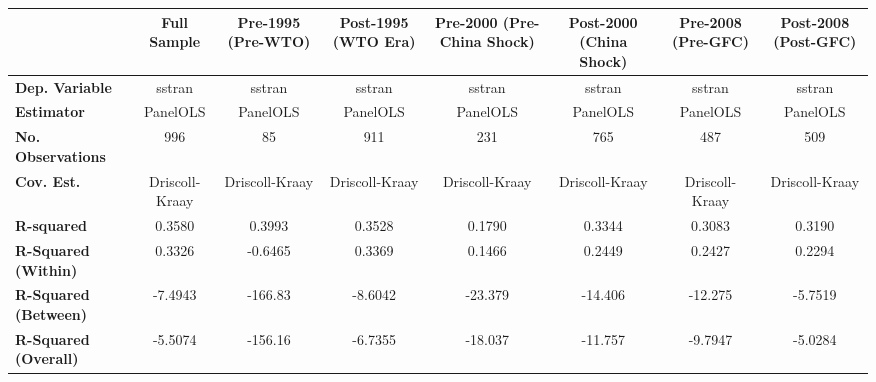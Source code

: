 \begin{center}
\begin{tabular}{lccccccc}
\toprule
                                   & \textbf{Full Sample} & \textbf{Pre-1995 (Pre-WTO)} & \textbf{Post-1995 (WTO Era)} & \textbf{Pre-2000 (Pre-China Shock)} & \textbf{Post-2000 (China Shock)} & \textbf{Pre-2008 (Pre-GFC)} & \textbf{Post-2008 (Post-GFC)}  \\
\midrule
\textbf{Dep. Variable}             &        sstran        &            sstran           &            sstran            &                sstran               &              sstran              &            sstran           &             sstran             \\
\textbf{Estimator}                 &       PanelOLS       &           PanelOLS          &           PanelOLS           &               PanelOLS              &             PanelOLS             &           PanelOLS          &            PanelOLS            \\
\textbf{No. Observations}          &         996          &              85             &             911              &                 231                 &               765                &             487             &              509               \\
\textbf{Cov. Est.}                 &    Driscoll-Kraay    &        Driscoll-Kraay       &        Driscoll-Kraay        &            Driscoll-Kraay           &          Driscoll-Kraay          &        Driscoll-Kraay       &         Driscoll-Kraay         \\
\textbf{R-squared}                 &        0.3580        &            0.3993           &            0.3528            &                0.1790               &              0.3344              &            0.3083           &             0.3190             \\
\textbf{R-Squared (Within)}        &        0.3326        &           -0.6465           &            0.3369            &                0.1466               &              0.2449              &            0.2427           &             0.2294             \\
\textbf{R-Squared (Between)}       &       -7.4943        &           -166.83           &           -8.6042            &               -23.379               &             -14.406              &           -12.275           &            -5.7519             \\
\textbf{R-Squared (Overall)}       &       -5.5074        &           -156.16           &           -6.7355            &               -18.037               &             -11.757              &           -9.7947           &            -5.0284             \\

\end{tabular}
\end{center}
